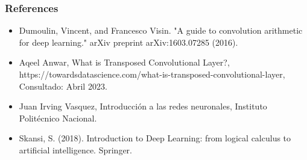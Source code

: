\documentclass[aspectratio=169]{beamer}
\begin{document}
\begin{frame}
\frametitle{References}
\begin{itemize}
	\item Dumoulin, Vincent, and Francesco Visin. "A guide to convolution arithmetic for deep learning." arXiv preprint arXiv:1603.07285 (2016).
	\item Aqeel Anwar, What is Transposed Convolutional Layer?, https://towardsdatascience.com/what-is-transposed-convolutional-layer, Consultado: Abril 2023.
	\item Juan Irving Vasquez, Introducción a las redes neuronales, Instituto Politécnico Nacional.
	\item Skansi, S. (2018). Introduction to Deep Learning: from logical calculus to artificial intelligence. Springer.
\end{itemize}
\end{frame}
\end{document}
